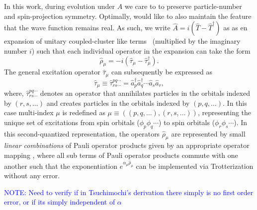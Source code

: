 \documentclass[aip,jcp,amsmath,amssymb, reprint]{revtex4-1}
\newcommand{\cop}[1]{\hat{a}^{\dagger}_{#1}}
\newcommand{\aop}[1]{\hat{a}_{#1}}
\newcommand{\note}[2]{%
  \ifthenelse{\boolean{shownotes}}%
    {\textcolor{#1}{#2}}%
    {}%
}
\begin{document}
In this work, during evolution under $\hat{A}$ we care to to preserve particle-number and spin-projection symmetry.
Optimally, would like to also maintain the feature that the wave function remains real.
As such, we write $\hat{A} = i(\hat{T} - \hat{T}^\dagger)$ as as en expansion of unitary coupled-cluster like terms~\cite{} (multiplied by the imaginary number $i$) such that each individual operator in the expansion can take the form
\begin{equation}
\hat{\rho}_\mu = -i(\hat{\tau}_\mu - \hat{\tau}_\mu^\dagger).
\end{equation} 
The general excitation operator $\hat{\tau}_\mu$ can subsequently be expressed as
$$
\hat{\tau}_\mu \equiv \hat{\tau}_{rs\cdots}^{pq\cdots} = \cop{p} \cop{q} \cdots \aop{s} \aop{r},
$$
where, $\hat{\tau}_{rs\cdots}^{pq\cdots}$ denotes an operator that annihilates particles in the orbitals indexed by $(r,s,\ldots)$ and creates particles in the  orbitals indexed by $(p,q,\ldots)$. 
In this case multi-index $\mu$ is redefined as $\mu \equiv ((p,q,\ldots),(r,s,\ldots))$, representing the unique set of excitations from spin orbitals ($\phi_p \phi_q \cdots$) to spin orbitals ($\phi_r \phi_s \cdots$).
In this second-quantized representation, the operators $\hat{\rho}_\mu$ are represented by small \textit{linear combinations} of Pauli operator products given by an appropriate operator mapping \cite{}, where all sub terms of Pauli operator products commute with one another such that the exponentiation $e^{\alpha_\mu \hat{\rho}_\mu}$ can be implemented via Trotterization without any error. 

\note{blue}{NOTE: Need to verify if in Tsuchimochi's derivation there simply is no first order error, or if its simply independent of $\alpha$}
\end{document}
